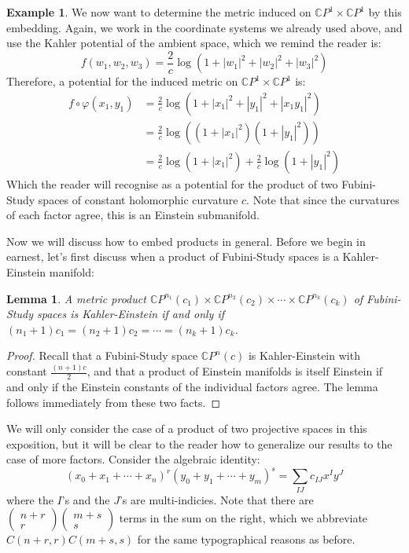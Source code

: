 \documentclass[11pt]{amsart}
\newtheorem{lem}[subsection]{Lemma}
\theoremstyle{definition}
\newtheorem{example}[subsection]{Example}
\def \CP{ \mathbb{C}P }
\begin{document}
\begin{example}
We now want to determine the metric induced on $\CP^1 \times \CP^1$ by this embedding.  Again, we work in the coordinate systems we already used above, and use the Kahler potential of the ambient space, which we remind the reader is:
%
$$ f(w_1,w_2,w_3) = \frac{2}{c} \log ( 1 + |w_1|^2 + |w_2|^2 + |w_3|^2 ) $$
%
Therefore, a potential for the induced metric on $\CP^1 \times \CP^1$ is:
%
\begin{align*}
f \circ \varphi ( x_1, y_1 ) &= \frac{2}{c} \log ( 1 + |x_1|^2 + |y_1|^2 + |x_1 y_1|^2 ) \\
&= \frac{2}{c} \log ( (1 + |x_1|^2) (1 + |y_1|^2 ) ) \\
&= \frac{2}{c} \log ( 1 + |x_1|^2 ) + \frac{2}{c} \log ( 1 + |y_1|^2 )
\end{align*}
%
Which the reader will recognise as a potential for the product of two Fubini-Study spaces of constant holomorphic curvature $c$.  Note that since the curvatures of each factor agree, this is an Einstein submanifold.
\end{example}

Now we will discuss how to embed products in general.  Before we begin in earnest, let's first discuss when a product of Fubini-Study spaces is a Kahler-Einstein manifold:

\begin{lem}
A metric product $\CP^{n_1}(c_1) \times \CP^{n_2}(c_2) \times \cdots \times \CP^{n_k}(c_k)$ of Fubini-Study spaces is Kahler-Einstein if and only if $(n_1 + 1) c_1 = (n_2 + 1) c_2 = \cdots = (n_k + 1) c_k$.
\end{lem}

\begin{proof}
Recall that a Fubini-Study space $\CP^n(c)$ is Kahler-Einstein with constant $\frac{(n+1)c}{2}$, and that a product of Einstein manifolds is itself Einstein if and only if the Einstein constants of the individual factors agree.  The lemma follows immediately from these two facts.
\end{proof}

We will only consider the case of a product of two projective spaces in this exposition, but it will be clear to the reader how to generalize our results to the case of more factors.  Consider the algebraic identity:
%
$$ (x_0 + x_1 + \cdots + x_n)^r (y_0 + y_1 + \cdots + y_m)^s = \sum_{IJ} c_{IJ} x^I y^J $$
%
where the $I$'s and the $J$'s are multi-indicies.  Note that there are $\left( \begin{array}{c} n  + r \\ r \end{array} \right) \left( \begin{array}{c} m + s \\ s \end{array} \right)$ terms in the sum on the right, which we abbreviate $C(n + r, r) C( m + s, s)$ for the same typographical reasons as before.  
\end{document}
